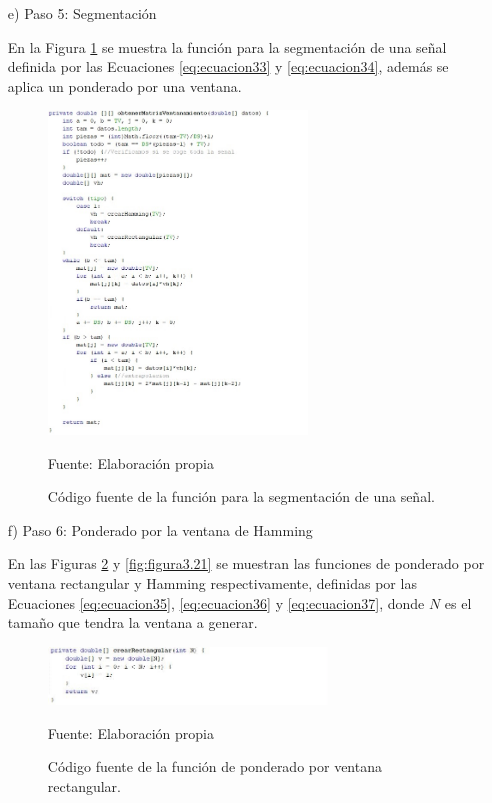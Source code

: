 \begin{enumerate}
\item[e)]Paso 5: Segmentación
\par
En la Figura \ref{fig:figura3.19} se muestra la función para la segmentación de una señal definida por las Ecuaciones \eqref{eq:ecuacion33} y \eqref{eq:ecuacion34}, además se aplica un ponderado por una ventana.
\begin{figure}[H]
\captionsetup{justification=centering}
\begin{center}
\includegraphics[width=0.65\textwidth]{Imagenes/Cap3/image019}
\end{center}
\begin{center}
\vskip -0.5cm
\caption{\small{Código fuente de la función para la segmentación de una señal.}}
\label{fig:figura3.19}
{\small{Fuente: Elaboración propia}}
\end{center}
\end{figure}

\item[f)]Paso 6: Ponderado por la ventana de Hamming
\par
En las Figuras \ref{fig:figura3.20} y \ref{fig:figura3.21} se muestran las funciones de ponderado por ventana rectangular y Hamming respectivamente, definidas por las Ecuaciones \eqref{eq:ecuacion35}, \eqref{eq:ecuacion36} y \eqref{eq:ecuacion37}, donde $N$ es el tamaño que tendra la ventana a generar.
\begin{figure}[H]
\captionsetup{justification=centering}
\begin{center}
\includegraphics[width=0.7\textwidth]{Imagenes/Cap3/image020}
\end{center}
\begin{center}
\vskip -0.5cm
\caption{\small{Código fuente de la función de ponderado por ventana rectangular.}}
\label{fig:figura3.20}
{\small{Fuente: Elaboración propia}}
\end{center}
\end{figure}


\end{enumerate}
